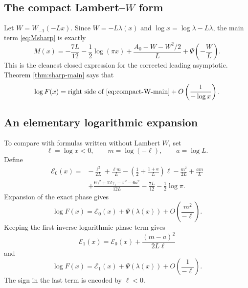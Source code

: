 \documentclass[11pt]{article}
\numberwithin{equation}{section}
\theoremstyle{definition}
\theoremstyle{remark}
\begin{document}
\subsection{The compact Lambert--\texorpdfstring{$W$}{W} form}

Let $W=W_{-1}(-Lx)$.  Since $W=-L\lambda(x)$ and
$\log x=\log\lambda-L\lambda$, the main term
\eqref{eq:Msharp} is exactly
\begin{equation}\label{eq:compact-W-main}
 \boxed{
 M(x)=-\frac{7L}{12}-\frac12\log(\pi x)
 +\frac{A_0-W-W^2/2}{L}
 +\Psi\left(-\frac WL\right).}
\end{equation}
This is the cleanest closed expression for the corrected leading asymptotic.
Theorem \ref{thm:sharp-main} says that
\begin{equation}\label{eq:compact-W-asymptotic}
 \log F(x)=\text{right side of \eqref{eq:compact-W-main}}
 +O\left(\frac1{-\log x}\right).
\end{equation}

\subsection{An elementary logarithmic expansion}

To compare with formulas written without Lambert $W$, set
\begin{equation}\label{eq:ellma}
 \ell=\log x<0,
 \qquad m=\log(-\ell),
 \qquad a=\log L.
\end{equation}
Define
\begin{equation}\label{eq:E0-explicit}
 \begin{split}
 \mathcal E_0(x)={}&-\frac{\ell^2}{2L}+\frac{\ell m}{L}
 -\left(\frac12+\frac{1+a}{L}\right)\ell
 -\frac{m^2}{2L}+\frac{am}{L}\\
 &+\frac{6\gamma^2+12\gamma_1-\pi^2-6a^2}{12L}
 -\frac{7L}{12}-\frac12\log\pi.
 \end{split}
\end{equation}
Expansion of the exact phase gives
\begin{equation}\label{eq:elementary-corrected-coarse}
 \log F(x)=\mathcal E_0(x)+\Psi(\lambda(x))
 +O\left(\frac{m^2}{-\ell}\right).
\end{equation}
Keeping the first inverse-logarithmic phase term gives
\begin{equation}\label{eq:E1-explicit}
 \mathcal E_1(x)=\mathcal E_0(x)+\frac{(m-a)^2}{2L\ell}
\end{equation}
and
\begin{equation}\label{eq:elementary-corrected-sharp}
 \log F(x)=\mathcal E_1(x)+\Psi(\lambda(x))
 +O\left(\frac1{-\ell}\right).
\end{equation}
The sign in the last term is encoded by $\ell<0$.
\end{document}
